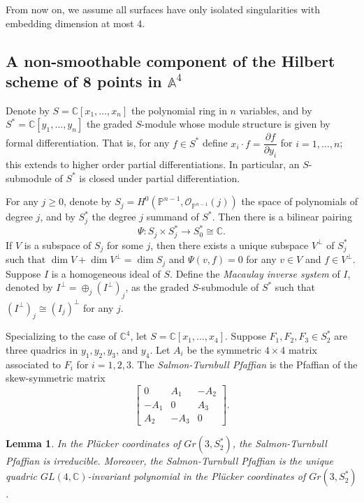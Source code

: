 \documentclass{amsart}[12pt]
\newtheorem{lemma}[theorem]{Lemma}
\theoremstyle{definition}
\theoremstyle{remark}
\numberwithin{equation}{section}
\begin{document}
From now on, we assume all surfaces have only isolated singularities with embedding dimension at most 4. 

\subsection{A non-smoothable component of the Hilbert scheme of 8 points in $\mathbb{A}^4$}

Denote by $S = \mathbb{C}[x_1, \dots, x_n]$ the polynomial ring in $n$ variables, and by $S^* = \mathbb{C}[y_1, \dots, y_n]$ the graded $S$-module whose module structure is given by formal differentiation. That is, for any $f \in S^*$ define $x_i \cdot f = \dfrac{\partial f}{\partial y_i}$ for $i = 1, \dots, n$; this extends to higher order partial differentiations. In particular, an $S$-submodule of $S^*$ is closed under partial differentiation. 

For any $j \geq 0$, denote by $S_j = H^0(\mathbb{P}^{n - 1}, \mathcal{O}_{\mathbb{P}^{n - 1}}(j))$ the space of polynomials of degree $j$, and by $S_j^*$ the degree $j$ summand of $S^*$. Then there is a bilinear pairing 
\begin{equation}\label{pairing}
\Psi: S_j \times S_j^* \to S_0^* \cong \mathbb{C}.
\end{equation}
If $V$ is a subspace of $S_j$ for some $j$, then there exists a unique subspace $V^{\perp}$ of $S_j^*$ such that $\dim V + \dim V^{\perp} = \dim S_j$ and $\Psi(v, f) = 0$ for any $v \in V$ and $f \in V^{\perp}$. Suppose $I$ is a homogeneous ideal of $S$. Define the \textit{Macaulay inverse system} of $I$, denoted by $I^{\perp} = \oplus_j(I^{\perp})_j$, as the graded $S$-submodule of $S^*$ such that $(I^{\perp})_j \cong (I_j)^{\perp}$ for any $j$.

Specializing to the case of $\mathbb{C}^4$, let $S = \mathbb{C}[x_1, \dots, x_4]$. Suppose $F_1, F_2, F_3 \in S_2^*$ are three quadrics in $y_1, y_2, y_3$, and $y_4$. Let $A_i$ be the symmetric $4 \times 4$ matrix associated to $F_i$ for $i = 1, 2, 3$. The \textit{Salmon-Turnbull Pfaffian} is the Pfaffian of the skew-symmetric matrix
\[
\begin{bmatrix}
0 & A_1 & -A_2 \\ -A_1 & 0 & A_3 \\ A_2 & -A_3 & 0
\end{bmatrix}.
\]

\begin{lemma}
In the Pl\"ucker coordinates of $Gr(3, S_2^*)$, the Salmon-Turnbull Pfaffian is irreducible. Moreover, the Salmon-Turnbull Pfaffian is the unique quadric $GL(4, \mathbb{C})$-invariant polynomial in the Pl\"ucker coordinates of $Gr(3, S_2^*)$.
\end{lemma}
\end{document}
